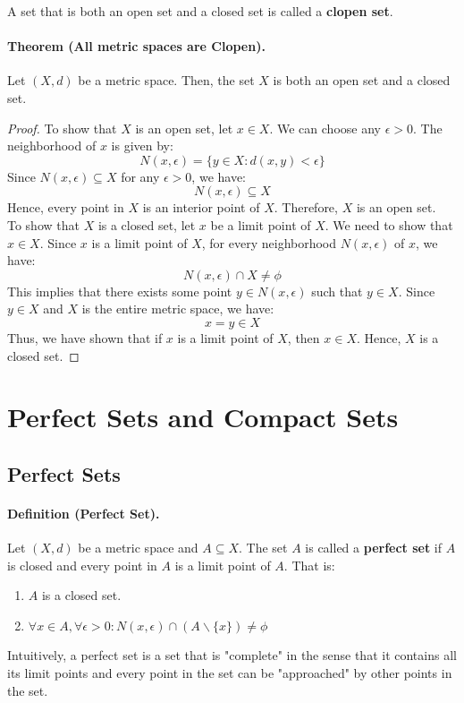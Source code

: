 \documentclass[openany]{book}
\numberwithin{equation}{section}
\begin{document}
    A set that is both an open set and a closed set is called a \textbf{clopen set}.
\par
\paragraph{Theorem (All metric spaces are Clopen).}

    Let $(X, d)$ be a metric space. Then, the set $X$ is both an open set and a closed set.
\par
\begin{proof}
    To show that $X$ is an open set, let $x \in X$. We can choose any $\epsilon > 0$. The neighborhood of $x$ is given by:
    $$N(x, \epsilon) = \{y \in X: d(x, y) < \epsilon\}$$
    Since $N(x, \epsilon) \subseteq X$ for any $\epsilon > 0$, we have:
    $$N(x, \epsilon) \subseteq X$$
    Hence, every point in $X$ is an interior point of $X$. Therefore, $X$ is an open set. \\
    To show that $X$ is a closed set, let $x$ be a limit point of $X$. We need to show that $x \in X$. Since $x$ is a limit point of $X$, for every neighborhood $N(x, \epsilon)$ of $x$, we have:
    $$N(x, \epsilon) \cap X \neq \phi$$
    This implies that there exists some point $y \in N(x, \epsilon)$ such that $y \in X$. Since $y \in X$ and $X$ is the entire metric space, we have:
    $$x = y \in X$$
    Thus, we have shown that if $x$ is a limit point of $X$, then $x \in X$. Hence, $X$ is a closed set.
\end{proof}
\section{Perfect Sets and Compact Sets}
\subsection{Perfect Sets}
\paragraph{Definition (Perfect Set).}

    Let $(X, d)$ be a metric space and $A \subseteq X$. The set $A$ is called a \textbf{perfect set} if $A$ is closed and every point in $A$ is a limit point of $A$. That is:
    \begin{enumerate}
        \item $A$ is a closed set.
        \item $\forall x \in A, \forall \epsilon > 0: N(x, \epsilon) \cap (A \backslash \{x\}) \neq \phi$
    \end{enumerate}
    Intuitively, a perfect set is a set that is "complete" in the sense that it contains all its limit points and every point in the set can be "approached" by other points in the set.
\par
\end{document}
